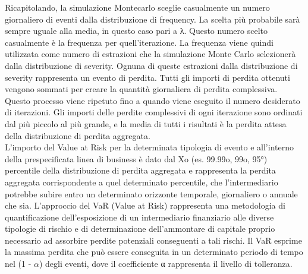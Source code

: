 \documentclass[titlepage]{article}
\begin{document}
\begin{itemize}
\begin{itemize}
\end{itemize}
Ricapitolando, la simulazione Montecarlo sceglie casualmente un numero giornaliero di eventi dalla distribuzione di frequency. La scelta più probabile sarà sempre uguale alla media, in questo caso pari a λ. Questo numero scelto casualmente è la frequenza per quell’iterazione. La frequenza viene quindi utilizzata come numero di estrazioni che la simulazione Monte Carlo selezionerà dalla distribuzione di severity. Ognuna di queste estrazioni dalla distribuzione di severity rappresenta un evento di perdita. Tutti gli importi di perdita ottenuti vengono sommati per creare la quantità giornaliera di perdita complessiva. Questo processo viene ripetuto fino a quando viene eseguito il numero desiderato di iterazioni. Gli importi delle perdite complessivi di ogni iterazione sono ordinati dal più piccolo al più grande, e la media di tutti i risultati è la perdita attesa della distribuzione di perdita aggregata.
\\
L'importo del Value at Risk per la determinata tipologia di evento e all’interno della prespecificata linea di business è dato dal Xo (es. 99.99o, 99o, 95°) percentile della distribuzione di perdita aggregata e rappresenta la perdita aggregata corrispondente a quel determinato percentile, che l’intermediario potrebbe subire entro un determinato orizzonte temporale, giornaliero o annuale che sia. L’approccio del VaR (Value at Risk) rappresenta una metodologia di quantificazione dell’esposizione di un intermediario finanziario alle diverse tipologie di rischio e di determinazione dell’ammontare di capitale proprio necessario ad assorbire perdite potenziali conseguenti a tali rischi. Il VaR esprime la massima perdita che può essere conseguita in un determinato periodo di tempo nel (1 - $\alpha$) degli eventi, dove il coefficiente α rappresenta il livello di tolleranza.
\\


\end{itemize}
\end{document}
